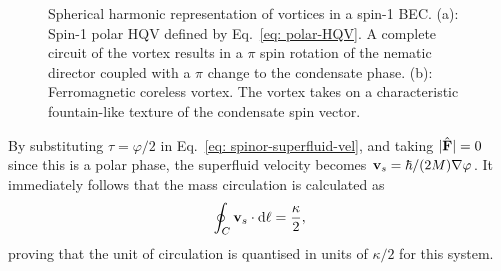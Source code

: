\begin{figure}
    \centering
    \caption[Spherical harmonic representation of spin-1 vortices]
    {\label{fig: spin-1-vortices}Spherical harmonic representation of vortices
        in a spin-1 BEC\@.
        (a): Spin-1 polar HQV defined by Eq.~\eqref{eq: polar-HQV}.
        A complete circuit of the vortex results in a \(\pi \) spin rotation of
        the nematic director coupled with a \(\pi \) change to the condensate
        phase.
        (b): Ferromagnetic coreless vortex.
        The vortex takes on a characteristic fountain-like texture of the
        condensate spin vector.}
\end{figure}
By substituting \(\tau=\varphi/2\) in Eq.~\eqref{eq: spinor-superfluid-vel},
and taking \(|\hat{\vb{F}}|=0\) since this is a polar phase, the superfluid
velocity becomes \(\vb{v}_s = \hbar/(2M)\nabla\varphi \).
It immediately follows that the mass circulation is calculated as
\begin{align}
    \oint_C \vb{v}_s \cdot \dd \vb{\ell} = \frac{\kappa}{2},
\end{align}
proving that the unit of circulation is quantised in units of \(\kappa / 2\) for
this system.

